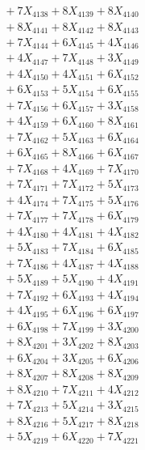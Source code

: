 \documentclass[a4paper,10pt]{article}
\begin{document}
{\begin{align}
&\;  + 7 X_{4138} + 8 X_{4139} + 8 X_{4140} \\[0.3ex]
&\;  + 8 X_{4141} + 8 X_{4142} + 8 X_{4143} \\[0.3ex]
&\;  + 7 X_{4144} + 6 X_{4145} + 4 X_{4146} \\[0.3ex]
&\;  + 4 X_{4147} + 7 X_{4148} + 3 X_{4149} \\[0.5ex]\allowbreak
&\;  + 4 X_{4150} + 4 X_{4151} + 6 X_{4152} \\[0.3ex]
&\;  + 6 X_{4153} + 5 X_{4154} + 6 X_{4155} \\[0.3ex]
&\;  + 7 X_{4156} + 6 X_{4157} + 3 X_{4158} \\[0.3ex]
&\;  + 4 X_{4159} + 6 X_{4160} + 8 X_{4161} \\[0.3ex]
&\;  + 7 X_{4162} + 5 X_{4163} + 6 X_{4164} \\[0.3ex]
&\;  + 6 X_{4165} + 8 X_{4166} + 6 X_{4167} \\[0.3ex]
&\;  + 7 X_{4168} + 4 X_{4169} + 7 X_{4170} \\[0.3ex]
&\;  + 7 X_{4171} + 7 X_{4172} + 5 X_{4173} \\[0.3ex]
&\;  + 4 X_{4174} + 7 X_{4175} + 5 X_{4176} \\[0.3ex]
&\;  + 7 X_{4177} + 7 X_{4178} + 6 X_{4179} \\[0.5ex]\allowbreak
&\;  + 4 X_{4180} + 4 X_{4181} + 4 X_{4182} \\[0.3ex]
&\;  + 5 X_{4183} + 7 X_{4184} + 6 X_{4185} \\[0.3ex]
&\;  + 7 X_{4186} + 4 X_{4187} + 4 X_{4188} \\[0.3ex]
&\;  + 5 X_{4189} + 5 X_{4190} + 4 X_{4191} \\[0.3ex]
&\;  + 7 X_{4192} + 6 X_{4193} + 4 X_{4194} \\[0.3ex]
&\;  + 4 X_{4195} + 6 X_{4196} + 6 X_{4197} \\[0.3ex]
&\;  + 6 X_{4198} + 7 X_{4199} + 3 X_{4200} \\[0.3ex]
&\;  + 8 X_{4201} + 3 X_{4202} + 8 X_{4203} \\[0.3ex]
&\;  + 6 X_{4204} + 3 X_{4205} + 6 X_{4206} \\[0.3ex]
&\;  + 8 X_{4207} + 8 X_{4208} + 8 X_{4209} \\[0.5ex]\allowbreak
&\;  + 8 X_{4210} + 7 X_{4211} + 4 X_{4212} \\[0.3ex]
&\;  + 7 X_{4213} + 5 X_{4214} + 3 X_{4215} \\[0.3ex]
&\;  + 8 X_{4216} + 5 X_{4217} + 8 X_{4218} \\[0.3ex]
&\;  + 5 X_{4219} + 6 X_{4220} + 7 X_{4221} \\[0.3ex]

\end{align}}
\end{document}
